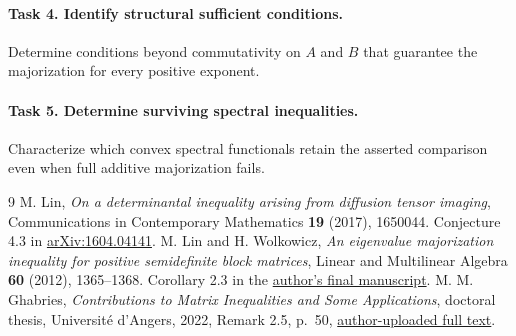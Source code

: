 \documentclass[11pt]{article}
\begin{document}
\paragraph{Task 4. Identify structural sufficient conditions.}
Determine conditions beyond commutativity on $A$ and $B$ that guarantee
the majorization for every positive exponent.

\paragraph{Task 5. Determine surviving spectral inequalities.}
Characterize which convex spectral functionals retain the asserted
comparison even when full additive majorization fails.

\begin{thebibliography}{9}
M. Lin, \emph{On a determinantal inequality arising from diffusion tensor
imaging}, Communications in Contemporary Mathematics \textbf{19} (2017),
1650044. Conjecture 4.3 in
\href{https://arxiv.org/abs/1604.04141}{arXiv:1604.04141}.
M. Lin and H. Wolkowicz, \emph{An eigenvalue majorization inequality for
positive semidefinite block matrices}, Linear and Multilinear Algebra
\textbf{60} (2012), 1365--1368. Corollary 2.3 in the
\href{https://www.math.uwaterloo.ca/~hwolkowi/henry/reports/finalLAMAdec18.pdf}{author's final manuscript}.
M. M. Ghabries, \emph{Contributions to Matrix Inequalities and Some
Applications}, doctoral thesis, Universit\'e d'Angers, 2022,
Remark 2.5, p.~50,
\href{https://www.researchgate.net/publication/361793582_Contributions_to_Matrix_Inequalities_and_Some_Applications}{author-uploaded full text}.
\end{thebibliography}
\end{document}
